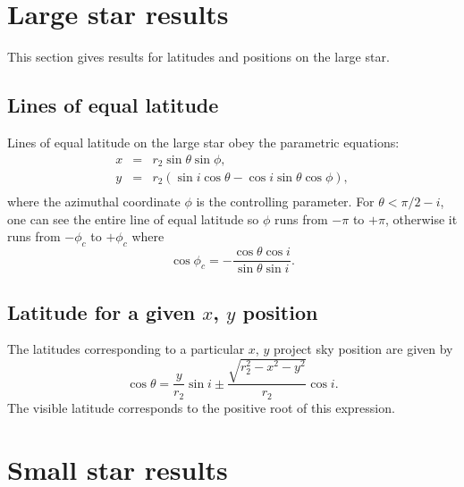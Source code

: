 \documentclass[10pt,a4paper]{article}
\begin{document}
\section{Large star results}

This section gives results for latitudes and positions on the large star.

\subsection{Lines of equal latitude}
Lines of equal latitude on the large star obey the parametric equations:
\begin{eqnarray*}
x &=& r_2 \sin \theta \sin \phi,\\
y &=& r_2 \left(\sin i \cos \theta - \cos i \sin \theta \cos \phi\right),\\
\end{eqnarray*}
where the azimuthal coordinate $\phi$ is the controlling parameter.
For $\theta < \pi/2 - i$, one can see the entire line of equal latitude
so $\phi$ runs from $-\pi$ to $+\pi$, otherwise it runs from $-\phi_c$ to
$+\phi_c$ where
\begin{equation}
\cos \phi_c = - \frac{\cos \theta \cos i}{\sin \theta \sin i} .
\end{equation}

\subsection{Latitude for a given $x$, $y$ position}
The latitudes corresponding to a particular $x$, $y$ project sky position 
are given by
\begin{equation}
\cos \theta = \frac{y}{r_2} \sin i \pm \frac{\sqrt{r_2^2 - x^2 - y^2}}{r_2}
\cos i .
\end{equation}
The visible latitude corresponds to the positive root of this expression.

\section{Small star results}
\end{document}
